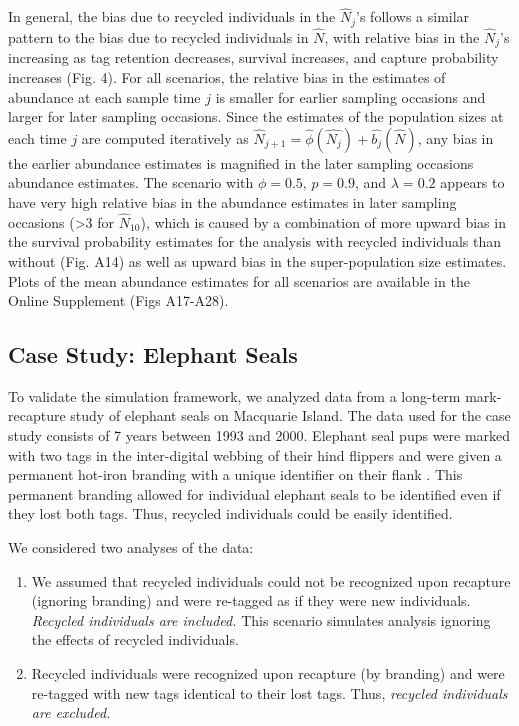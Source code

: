 \documentclass[12pt]{article}
\begin{document}
In general, the bias due to recycled individuals in the \(\hat{N}_j\)'s
follows a similar pattern to the bias due to recycled individuals in
\(\hat{N}\), with relative bias in the \(\hat{N}_j\)'s increasing as tag
retention decreases, survival increases, and capture probability
increases (Fig. 4). For all scenarios, the relative bias in the
estimates of abundance at each sample time \(j\) is smaller for earlier
sampling occasions and larger for later sampling occasions. Since the
estimates of the population sizes at each time \(j\) are computed
iteratively as
\(\hat{N}_{j+1}=\hat{\phi}(\hat{N_j})+\hat{b_j}(\hat{N})\), any bias in
the earlier abundance estimates is magnified in the later sampling
occasions abundance estimates. The scenario with \(\phi=0.5\),
\(p=0.9\), and \(\lambda=0.2\) appears to have very high relative bias
in the abundance estimates in later sampling occasions (\textgreater{}3
for \(\hat{N}_{10}\)), which is caused by a combination of more upward
bias in the survival probability estimates for the analysis with recycled
individuals than without (Fig. A14) as well as upward bias in the
super-population size estimates. Plots of the mean abundance estimates
for all scenarios are available in the Online Supplement (Figs A17-A28).

\subsection{Case Study: Elephant
Seals}\label{case-study-elephant-seals-1}


To validate the simulation framework, we analyzed data from a long-term mark-recapture study of elephant seals on Macquarie Island. The data
used for the case study consists of 7 years between 1993 and 2000. 
Elephant seal pups were marked with two tags in the inter-digital
webbing of their hind flippers and were given a permanent hot-iron
branding with a unique identifier on their flank \citep{McMahon:2009}. This
permanent branding allowed for individual elephant seals to be
identified even if they lost both tags. Thus, recycled individuals could
be easily identified.

We considered two analyses of the data:

\begin{enumerate}
\def\labelenumi{\arabic{enumi}.}
\item
  We assumed that recycled individuals could not be recognized upon
  recapture (ignoring branding) and were re-tagged as if they were new
  individuals.  \textit{ Recycled individuals are included.} This scenario simulates analysis ignoring the effects of recycled individuals. 
\item
  Recycled individuals were recognized upon recapture (by branding) and were re-tagged with new tags identical to their lost tags. Thus, \textit{recycled individuals are excluded.} 
\end{enumerate}
\end{document}
